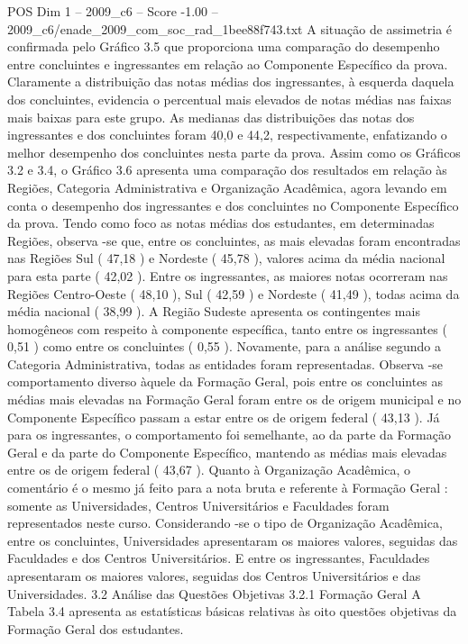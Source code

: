 \begin{textsample}{POS Dim 1 – 2009\_c6 – Score -1.00 – 2009\_c6/enade\_2009\_com\_soc\_rad\_1bee88f743.txt}
A situação de assimetria é confirmada pelo Gráfico 3.5 que proporciona uma comparação do desempenho entre concluintes e ingressantes em relação ao Componente Específico da prova.
Claramente a distribuição das notas médias dos ingressantes, à esquerda daquela dos concluintes, evidencia o percentual mais elevados de notas médias nas faixas mais baixas para este grupo.
As medianas das distribuições das notas dos ingressantes e dos concluintes foram 40,0 e 44,2, respectivamente, enfatizando o melhor desempenho dos concluintes nesta parte da prova.
Assim como os Gráficos 3.2 e 3.4, o Gráfico 3.6 apresenta uma comparação dos resultados em relação às Regiões, Categoria Administrativa e Organização Acadêmica, agora levando em conta o desempenho dos ingressantes e dos concluintes no Componente Específico da prova.
Tendo como foco as notas médias dos estudantes, em determinadas Regiões, observa -se que, entre os concluintes, as mais elevadas foram encontradas nas Regiões Sul ( 47,18 ) e Nordeste ( 45,78 ), valores acima da média nacional para esta parte ( 42,02 ).
Entre os ingressantes, as maiores notas ocorreram nas Regiões Centro-Oeste ( 48,10 ), Sul ( 42,59 ) e Nordeste ( 41,49 ), todas acima da média nacional ( 38,99 ).
A Região Sudeste apresenta os contingentes mais homogêneos com respeito à componente específica, tanto entre os ingressantes ( 0,51 ) como entre os concluintes ( 0,55 ).
Novamente, para a análise segundo a Categoria Administrativa, todas as entidades foram representadas.
Observa -se comportamento diverso àquele da Formação Geral, pois entre os concluintes as médias mais elevadas na Formação Geral foram entre os de origem municipal e no Componente Específico passam a estar entre os de origem federal ( 43,13 ).
Já para os ingressantes, o comportamento foi semelhante, ao da parte da Formação Geral e da parte do Componente Específico, mantendo as médias mais elevadas entre os de origem federal ( 43,67 ).
Quanto à Organização Acadêmica, o comentário é o mesmo já feito para a nota bruta e referente à Formação Geral : somente as Universidades, Centros Universitários e Faculdades foram representados neste curso.
Considerando -se o tipo de Organização Acadêmica, entre os concluintes, Universidades apresentaram os maiores valores, seguidas das Faculdades e dos Centros Universitários.
E entre os ingressantes, Faculdades apresentaram os maiores valores, seguidas dos Centros Universitários e das Universidades. 3.2 Análise das Questões Objetivas 3.2.1 Formação Geral A Tabela 3.4 apresenta as estatísticas básicas relativas às oito questões objetivas da Formação Geral dos estudantes.

\end{textsample}
